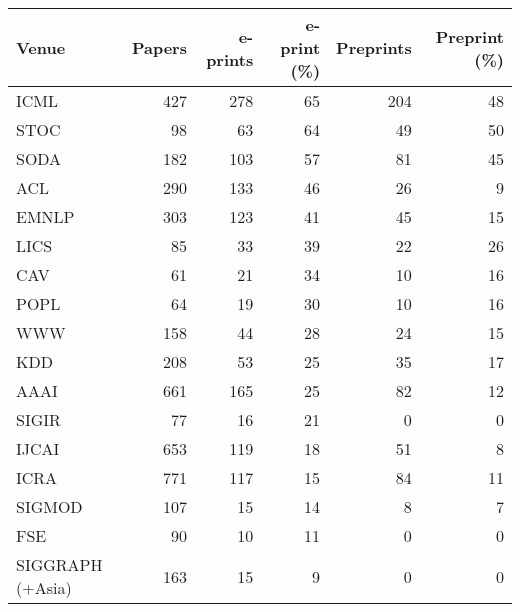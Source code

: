 \begin{tabular}{lrrrrr}
\toprule
            Venue &  Papers &  e-prints &  e-print (\%) &  Preprints &  Preprint (\%) \\
\midrule
             ICML &     427 &       278 &           65 &        204 &            48 \\
             STOC &      98 &        63 &           64 &         49 &            50 \\
             SODA &     182 &       103 &           57 &         81 &            45 \\
              ACL &     290 &       133 &           46 &         26 &             9 \\
            EMNLP &     303 &       123 &           41 &         45 &            15 \\
             LICS &      85 &        33 &           39 &         22 &            26 \\
              CAV &      61 &        21 &           34 &         10 &            16 \\
             POPL &      64 &        19 &           30 &         10 &            16 \\
              WWW &     158 &        44 &           28 &         24 &            15 \\
              KDD &     208 &        53 &           25 &         35 &            17 \\
             AAAI &     661 &       165 &           25 &         82 &            12 \\
            SIGIR &      77 &        16 &           21 &          0 &             0 \\
            IJCAI &     653 &       119 &           18 &         51 &             8 \\
             ICRA &     771 &       117 &           15 &         84 &            11 \\
           SIGMOD &     107 &        15 &           14 &          8 &             7 \\
              FSE &      90 &        10 &           11 &          0 &             0 \\
 SIGGRAPH (+Asia) &     163 &        15 &            9 &          0 &             0 \\
\bottomrule
\end{tabular}
